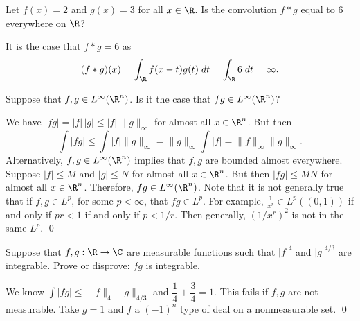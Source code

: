 \begin{quizsol}
Let $f(x)=2$ and $g(x)=3$ for all $x \in \R$. Is the convolution $f*g$ equal to 6 everywhere on $\R$?
\end{quizsol}

\pf It is the case that $f*g=6$ as
	\[
	(f*g)(x)= \int_\R f(x-t)g(t) \; dt= \int_\R 6 \; dt = \infty.
	\]


\begin{quizsol}
Suppose that $f,g \in L^\infty(\R^n)$. Is it the case that $fg \in L^\infty(\R^n)$? 
\end{quizsol}

\pf We have $|fg|=|f|\,|g| \leq |f| \, \|g\|_\infty$ for almost all $x \in \R^n$. But then
	\[
	\int |fg| \leq \int |f| \|g\|_\infty = \|g\|_\infty \int |f|= \|f\|_\infty \|g\|_\infty. 
	\]
Alternatively, $f,g \in L^\infty(\R^n)$ implies that $f,g$ are bounded almost everywhere. Suppose $|f| \leq M$ and $|g| \leq N$ for almost all $x \in \R^n$. But then $|fg| \leq MN$ for almost all $x \in \R^n$. Therefore, $fg \in L^\infty(\R^n)$. Note that it is not generally true that if $f,g \in L^p$, for some $p<\infty$, that $fg \in L^p$. For example, $\frac{1}{x^r} \in L^p((0,1))$ if and only if $pr<1$ if and only if $p<1/r$. Then generally, $(1/x^r)^2$ is not in the same $L^p$. \qed \\


%


\begin{quizsol}
Suppose that $f,g: \R \to \C$ are measurable functions such that $|f|^4$ and $|g|^{4/3}$ are integrable. Prove or disprove: $fg$ is integrable.
\end{quizsol}

\pf We know $\int |fg| \leq \|f\|_4 \|g\|_{4/3}$ and $\dfrac{1}{4} + \dfrac{3}{4} = 1$. This fails if $f,g$ are not measurable. Take $g=1$ and $f$ a $(-1)^n$ type of deal on a nonmeasurable set. \qed \\

























